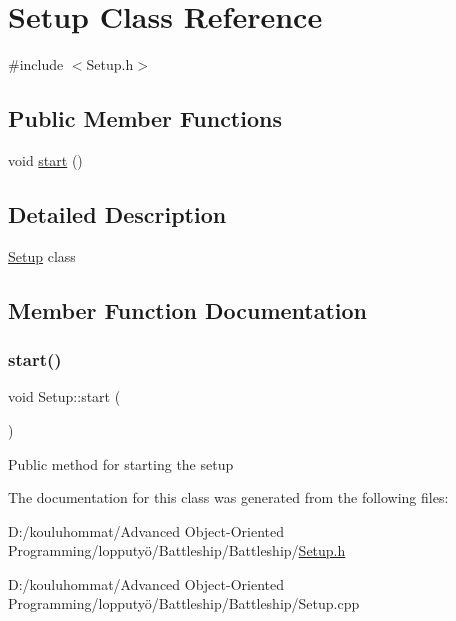 \hypertarget{class_setup}{}\section{Setup Class Reference}
\label{class_setup}


{\ttfamily \#include $<$Setup.\+h$>$}

\subsection*{Public Member Functions}
\begin{DoxyCompactItemize}
\item 
void \mbox{\hyperlink{class_setup_a28f3240b979d436ac1aa463a637afae6}{start}} ()
\end{DoxyCompactItemize}


\subsection{Detailed Description}
\mbox{\hyperlink{class_setup}{Setup}} class 

\subsection{Member Function Documentation}
\mbox{\label{class_setup_a28f3240b979d436ac1aa463a637afae6}} 
\subsubsection{\texorpdfstring{start()}{start()}}
{\footnotesize\ttfamily void Setup\+::start (\begin{DoxyParamCaption}{ }\end{DoxyParamCaption})}

Public method for starting the setup 

The documentation for this class was generated from the following files\+:\begin{DoxyCompactItemize}
\item 
D\+:/kouluhommat/\+Advanced Object-\/\+Oriented Programming/lopputyö/\+Battleship/\+Battleship/\mbox{\hyperlink{_setup_8h}{Setup.\+h}}\item 
D\+:/kouluhommat/\+Advanced Object-\/\+Oriented Programming/lopputyö/\+Battleship/\+Battleship/Setup.\+cpp\end{DoxyCompactItemize}

